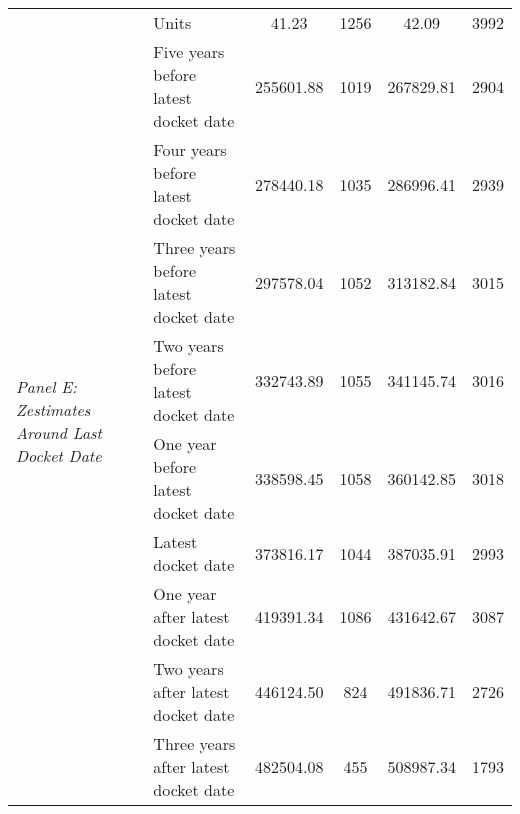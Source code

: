 \begin{tabular}{llcccc}
 & Units & 41.23 & 1256 & 42.09 & 3992 \\
\cline{1-6}
\multirow[c]{9}{4cm}{\textit{Panel E: Zestimates Around Last Docket Date}} & Five years before latest docket date & 255601.88 & 1019 & 267829.81 & 2904 \\
 & Four years before latest docket date & 278440.18 & 1035 & 286996.41 & 2939 \\
 & Three years before latest docket date & 297578.04 & 1052 & 313182.84 & 3015 \\
 & Two years before latest docket date & 332743.89 & 1055 & 341145.74 & 3016 \\
 & One year before latest docket date & 338598.45 & 1058 & 360142.85 & 3018 \\
 & Latest docket date & 373816.17 & 1044 & 387035.91 & 2993 \\
 & One year after latest docket date & 419391.34 & 1086 & 431642.67 & 3087 \\
 & Two years after latest docket date & 446124.50 & 824 & 491836.71 & 2726 \\
 & Three years after latest docket date & 482504.08 & 455 & 508987.34 & 1793 \\
\cline{1-6}
\bottomrule
\end{tabular}
